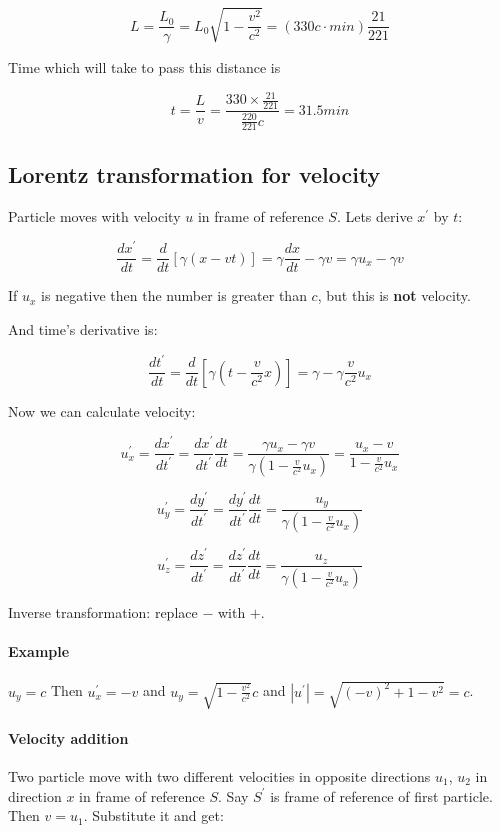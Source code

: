  $$L  =\frac{L_0}{\gamma} = L_0 \sqrt{1 - \frac{v^2}{c^2}} = \left(330 c \cdot min \right) \frac{21}{221}$$
 
 Time which will take to pass this distance is
 
 $$t = \frac{L}{v} = \frac{330 \times \frac{21}{221}}{\frac{220}{221}c} = 31.5 min$$
 
 \subsection{Lorentz transformation for velocity}
 
 Particle moves with velocity $u$ in frame of reference $S$. Lets derive $x^\prime$ by $t$:
 
 $$\frac{dx^\prime}{dt} = \frac{d}{dt} \left[ \gamma \left( x - vt \right) \right] = \gamma \frac{dx}{dt} - \gamma v = \gamma u_x - \gamma v$$
 
 If $u_x$ is negative then the number is greater than $c$, but this is \textbf{not} velocity.
 
 And time's derivative is:
 
 $$\frac{dt^\prime}{dt} = \frac{d}{dt} \left[ \gamma \left( t - \frac{v}{c^2}x \right) \right] = \gamma - \gamma \frac{v}{c^2}u_x$$
 
 Now we can calculate velocity:
 
 $$u_x^\prime = \frac{dx^\prime}{dt^\prime} = \frac{dx^\prime}{dt^\prime}\frac{dt}{dt} = \frac{\gamma u_x - \gamma v}{\gamma  \left(1- \frac{v}{c^2}u_x\right)} = \frac{ u_x - v}{1- \frac{v}{c^2}u_x}$$
 
 $$u_y^\prime = \frac{dy^\prime}{dt^\prime} = \frac{dy^\prime}{dt^\prime}\frac{dt}{dt} = \frac{u_y}{\gamma  \left(1- \frac{v}{c^2}u_x\right)}$$
 
 
 $$u_z^\prime = \frac{dz^\prime}{dt^\prime} = \frac{dz^\prime}{dt^\prime}\frac{dt}{dt} = \frac{u_z}{\gamma  \left(1- \frac{v}{c^2}u_x\right)}$$
 
 
 Inverse transformation: replace $-$ with $+$. 
 \paragraph{Example} $u_y = c$ Then $u_x^\prime = -v$ and $u_y = \sqrt{1-\frac{v^2}{c^2}}c$ and $\left| u^\prime \right| = \sqrt{\left(-v\right)^2 + 1 - v^2} = c$.
 
 \paragraph{Velocity addition} Two particle move with two different velocities in opposite directions $u_1$, $u_2$ in direction $x$ in frame of reference $S$. Say $S^\prime$ is frame of reference of first particle. Then $v=u_1$. Substitute it and get:
 
